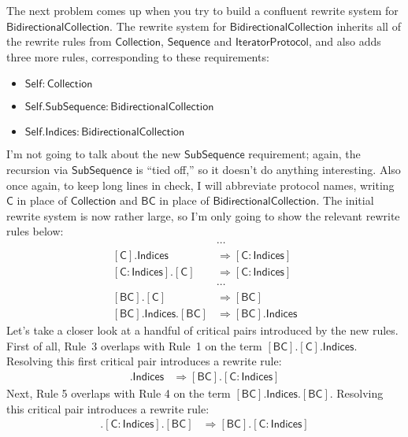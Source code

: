 \documentclass[a4paper,headsepline,bibliography=totoc,toc=flat,fleqn,twoside=semi]{scrbook}
\theoremstyle{definition}
\theoremstyle{definition}
\theoremstyle{definition}
\newcommand{\namesym}[1]{\mathsf{#1}}
\newcommand{\genericparam}[1]{\bm{\mathsf{#1}}}
\newcommand{\proto}[1]{\bm{\mathsf{#1}}}
\newcommand{\protosym}[1]{[\proto{#1}]}
\newcommand{\assocsym}[2]{[\proto{#1}\colon\namesym{#2}]}
\begin{document}
The next problem comes up when you try to build a confluent rewrite system for $\proto{BidirectionalCollection}$. The rewrite system for $\proto{BidirectionalCollection}$ inherits all of the rewrite rules from $\proto{Collection}$, $\proto{Sequence}$ and $\proto{IteratorProtocol}$, and also adds three more rules, corresponding to these requirements:
\begin{itemize}
\item $\genericparam{Self}\colon\proto{Collection}$
\item $\genericparam{Self}.\namesym{SubSequence}\colon\proto{BidirectionalCollection}$
\item $\genericparam{Self}.\namesym{Indices}\colon\proto{BidirectionalCollection}$
\end{itemize}
I'm not going to talk about the new $\namesym{SubSequence}$ requirement; again, the recursion via $\namesym{SubSequence}$ is ``tied off,'' so it doesn't do anything interesting. Also once again, to keep long lines in check, I will abbreviate protocol names, writing $\proto{C}$ in place of $\proto{Collection}$ and $\proto{BC}$ in place of $\proto{BidirectionalCollection}$. The initial rewrite system is now rather large, so I'm only going to show the relevant rewrite rules below:
\begin{align}
&\cdots\nonumber\\
\protosym{C}.\namesym{Indices}&\Rightarrow\assocsym{C}{Indices}\tag{1}\\
\assocsym{C}{Indices}.\protosym{C}&\Rightarrow\assocsym{C}{Indices}\tag{2}\\
&\cdots\nonumber\\
\protosym{BC}.\protosym{C}&\Rightarrow\protosym{BC}\tag{3}\\
\protosym{BC}.\namesym{Indices}.\protosym{BC}&\Rightarrow\protosym{BC}.\namesym{Indices}\tag{4}
\end{align}
Let's take a closer look at a handful of critical pairs introduced by the new rules. First of all, Rule~3 overlaps with Rule~1 on the term $\protosym{BC}.\protosym{C}.\namesym{Indices}$. Resolving this first critical pair introduces a rewrite rule:
\begin{align}
\protosym{BC}.\namesym{Indices}&\Rightarrow\protosym{BC}.\assocsym{C}{Indices}\tag{5}
\end{align}
Next, Rule 5 overlaps with Rule 4 on the term $\protosym{BC}.\namesym{Indices}.\protosym{BC}$.
Resolving this critical pair introduces a rewrite rule:
\begin{align}
\protosym{BC}.\assocsym{C}{Indices}.\protosym{BC}&\Rightarrow\protosym{BC}.\assocsym{C}{Indices}\tag{6}
\end{align}
\end{document}
